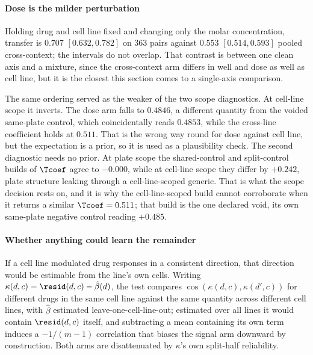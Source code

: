\paragraph{Dose is the milder perturbation} Holding drug and cell line fixed and
changing only the molar concentration, transfer is $0.707$ $[0.632, 0.782]$ on
$\num{363}$ pairs against $0.553$ $[0.514, 0.593]$ pooled cross-context; the
intervals do not overlap. That contrast is between one clean axis and a mixture,
since the cross-context arm differs in well and dose as well as cell line, but it
is the closest this section comes to a single-axis comparison.

The same ordering served as the weaker of the two scope diagnostics. At cell-line
scope it inverts. The dose arm falls to $0.4846$, a different quantity from the
voided same-plate control, which coincidentally reads $0.4853$, while the
cross-line coefficient holds at $0.511$. That is the wrong way round for dose
against cell line, but the expectation is a prior, so it is used as a
plausibility check. The second diagnostic needs no prior. At plate scope the
shared-control and split-control builds of $\Tcoef$ agree to $-0.000$, while at
cell-line scope they differ by $+0.242$, plate structure leaking through a
cell-line-scoped generic. That is what the scope decision rests on, and it is why
the cell-line-scoped build cannot corroborate when it returns a similar
$\Tcoef = 0.511$; that build is the one declared void, its own same-plate
negative control reading $+0.485$.

\paragraph{Whether anything could learn the remainder} If a cell line modulated
drug responses in a consistent direction, that direction would be estimable from
the line's own cells. Writing $\kappa(d,c) = \resid(d,c) - \hat{\beta}(d)$, the
test compares $\cos(\kappa(d,c), \kappa(d',c))$ for different drugs in the same
cell line against the same quantity across different cell lines, with
$\hat{\beta}$ estimated leave-one-cell-line-out; estimated over all lines it
would contain $\resid(d,c)$ itself, and subtracting a mean containing its own
term induces a $-1/(m-1)$ correlation that biases the signal arm downward by
construction. Both arms are disattenuated by $\kappa$'s own split-half
reliability.


